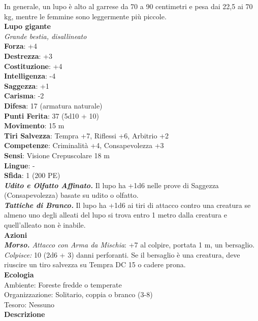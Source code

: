 \begin{multicols}{2}
In generale, un lupo è alto al garrese da 70 a 90 centimetri e pesa dai 22,5 ai 70 kg, mentre le femmine sono leggermente più piccole. \\

\medskip\textbf{Lupo gigante}\\
\emph{Grande bestia, disallineato}\\
\textbf{Forza}: +4\\
\textbf{Destrezza}: +3\\
\textbf{Costituzione}: +4\\
\textbf{Intelligenza}: -4\\
\textbf{Saggezza}: +1\\
\textbf{Carisma}: -2\\
\textbf{Difesa}: 17 (armatura naturale)\\
\textbf{Punti Ferita}: 37 (5d10 + 10)\\
\textbf{Movimento}: 15 m\\
\textbf{Tiri Salvezza}: Tempra +7, Riflessi +6, Arbitrio +2 \\
\textbf{Competenze}: Criminalità +4, Consapevolezza +3\\
\textbf{Sensi}: Visione Crepuscolare 18 m\\
\textbf{Lingue}: -\\
\textbf{Sfida}: 1 (200 PE)\smallskip\\
\emph{\textbf{Udito e Olfatto Affinato.}} Il lupo ha +1d6 nelle prove di Saggezza (Consapevolezza) basate su udito o olfatto.\\
\emph{\textbf{Tattiche di Branco.}} Il lupo ha +1d6 ai tiri di attacco contro una creatura se almeno uno degli alleati del lupo si trova entro 1 metro dalla creatura e quell'alleato non è inabile.\\
\smallskip\textbf{Azioni}\\
\emph{\textbf{Morso.} Attacco con Arma da Mischia}: +7 al colpire, portata 1 m, un bersaglio.\\
\emph{Colpisce:} 10 (2d6 + 3) danni perforanti. Se il bersaglio è una creatura, deve riuscire un tiro salvezza su Tempra DC  15 o cadere prona.\\
\textbf{Ecologia}\\
Ambiente: Foreste fredde o temperate\\
Organizzazione: Solitario, coppia o branco (3-8)\\
Tesoro: Nessuno\\
\textbf{Descrizione}\\


\end{multicols}
